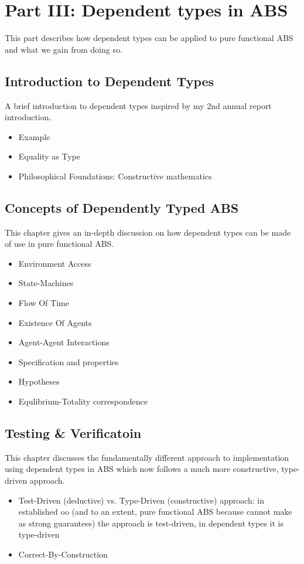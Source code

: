 \section{Part III: Dependent types in ABS}
This part describes how dependent types can be applied to pure functional ABS and what we gain from doing so.

\subsection{Introduction to Dependent Types}
A brief introduction to dependent types inspired by my 2nd annual report introduction.
\begin{itemize}
	\item Example
	\item Equality as Type
	\item Philosophical Foundations: Constructive mathematics
\end{itemize}

\subsection{Concepts of Dependently Typed ABS}
This chapter gives an in-depth discussion on how dependent types can be made of use in pure functional ABS.
\begin{itemize}
	\item Environment Access
	\item State-Machines
	\item Flow Of Time
	\item Existence Of Agents
	\item Agent-Agent Interactions
	\item Specification and properties
	\item Hypotheses
	\item Equlibrium-Totality correspondence
\end{itemize}

\subsection{Testing \& Verificatoin}
This chapter discusses the fundamentally different approach to implementation using dependent types in ABS which now follows a much more constructive, type-driven approach.
\begin{itemize}
	\item Test-Driven (deductive) vs. Type-Driven (constructive) approach: in established oo (and to an extent, pure functional ABS because cannot make as strong guarantees) the approach is test-driven, in dependent types it is type-driven
	\item Correct-By-Construction
\end{itemize}

